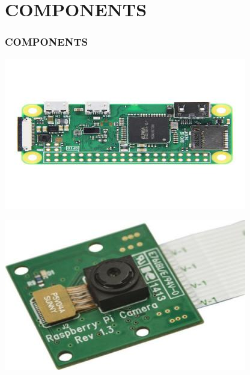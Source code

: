 \documentclass[
	11pt, %
	t, %
	aspectratio=169, %
]{beamer}
\begin{document}
\section{COMPONENTS}
\begin{frame}
	\frametitle{COMPONENTS}
	
	\begin{center}
		\begin{minipage}{0.30\textwidth}
			\includegraphics[width=\textwidth]{./resized_400x250/Raspberry_zero.jpg}
		\end{minipage}\hfill
		\begin{minipage}{0.30\textwidth}
			\includegraphics[width=\textwidth]{./resized_400x250/raspberry pi cam.jpg}
		\end{minipage}\hfill
		\begin{minipage}{0.30\textwidth}

\end{minipage}
\end{center}
\end{frame}
\end{document}
